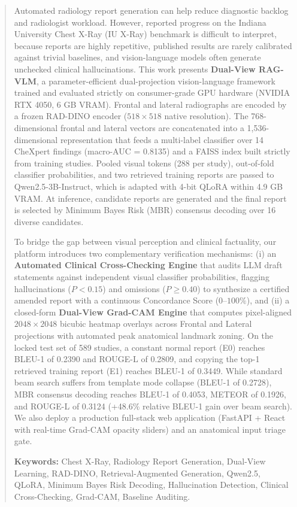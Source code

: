 \documentclass[12pt,a4paper]{report}
\begin{document}
\begin{abstract}
Automated radiology report generation can help reduce diagnostic backlog and radiologist workload. However, reported progress on the Indiana University Chest X-Ray (IU X-Ray) benchmark is difficult to interpret, because reports are highly repetitive, published results are rarely calibrated against trivial baselines, and vision-language models often generate unchecked clinical hallucinations. This work presents \textbf{Dual-View RAG-VLM}, a parameter-efficient dual-projection vision-language framework trained and evaluated strictly on consumer-grade GPU hardware (NVIDIA RTX 4050, 6 GB VRAM). Frontal and lateral radiographs are encoded by a frozen RAD-DINO encoder ($518 \times 518$ native resolution). The 768-dimensional frontal and lateral vectors are concatenated into a 1,536-dimensional representation that feeds a multi-label classifier over 14 CheXpert findings (macro-AUC = 0.8135) and a FAISS index built strictly from training studies. Pooled visual tokens (288 per study), out-of-fold classifier probabilities, and two retrieved training reports are passed to Qwen2.5-3B-Instruct, which is adapted with 4-bit QLoRA within 4.9 GB VRAM. At inference, candidate reports are generated and the final report is selected by Minimum Bayes Risk (MBR) consensus decoding over 16 diverse candidates. 

To bridge the gap between visual perception and clinical factuality, our platform introduces two complementary verification mechanisms: (i) an \textbf{Automated Clinical Cross-Checking Engine} that audits LLM draft statements against independent visual classifier probabilities, flagging hallucinations ($P < 0.15$) and omissions ($P \ge 0.40$) to synthesize a certified amended report with a continuous Concordance Score ($0$--$100\%$), and (ii) a closed-form \textbf{Dual-View Grad-CAM Engine} that computes pixel-aligned $2048 \times 2048$ bicubic heatmap overlays across Frontal and Lateral projections with automated peak anatomical landmark zoning. On the locked test set of 589 studies, a constant normal report (E0) reaches BLEU-1 of 0.2390 and ROUGE-L of 0.2809, and copying the top-1 retrieved training report (E1) reaches BLEU-1 of 0.3449. While standard beam search suffers from template mode collapse (BLEU-1 of 0.2728), MBR consensus decoding reaches BLEU-1 of 0.4053, METEOR of 0.1926, and ROUGE-L of 0.3124 (+48.6\% relative BLEU-1 gain over beam search). We also deploy a production full-stack web application (FastAPI + React with real-time Grad-CAM opacity sliders) and an anatomical input triage gate.

\vspace{0.5cm}
\noindent \textbf{Keywords:} Chest X-Ray, Radiology Report Generation, Dual-View Learning, RAD-DINO, Retrieval-Augmented Generation, Qwen2.5, QLoRA, Minimum Bayes Risk Decoding, Hallucination Detection, Clinical Cross-Checking, Grad-CAM, Baseline Auditing.
\end{abstract}
\end{document}
